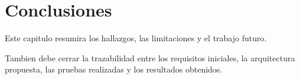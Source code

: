 \chapter{Conclusiones}

Este capitulo resumira los hallazgos, las limitaciones y el trabajo futuro.

Tambien debe cerrar la trazabilidad entre los requisitos iniciales, la arquitectura propuesta, las pruebas realizadas y los resultados obtenidos.
